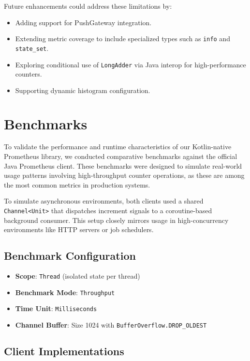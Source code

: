 Future enhancements could address these limitations by:
\begin{itemize}
  \item Adding support for PushGateway integration.
  \item Extending metric coverage to include specialized types such as \texttt{info} and \texttt{state\_set}.
  \item Exploring conditional use of \texttt{LongAdder} via Java interop for high-performance counters.  \item Supporting dynamic histogram configuration.
\end{itemize}


\section{Benchmarks}

To validate the performance and runtime characteristics of our Kotlin-native Prometheus library, we conducted comparative benchmarks against the official Java Prometheus client. These benchmarks were designed to simulate real-world usage patterns involving high-throughput counter operations, as these are among the most common metrics in production systems.

To simulate asynchronous environments, both clients used a shared \texttt{Channel<Unit>} that dispatches increment signals to a coroutine-based background consumer. This setup closely mirrors usage in high-concurrency environments like HTTP servers or job schedulers.

\subsection*{Benchmark Configuration}
\begin{itemize}
    \item \textbf{Scope}: \texttt{Thread} (isolated state per thread)
    \item \textbf{Benchmark Mode}: \texttt{Throughput}
    \item \textbf{Time Unit}: \texttt{Milliseconds}
    \item \textbf{Channel Buffer}: Size 1024 with \texttt{BufferOverflow.DROP\_OLDEST}
\end{itemize}

\subsection*{Client Implementations}


